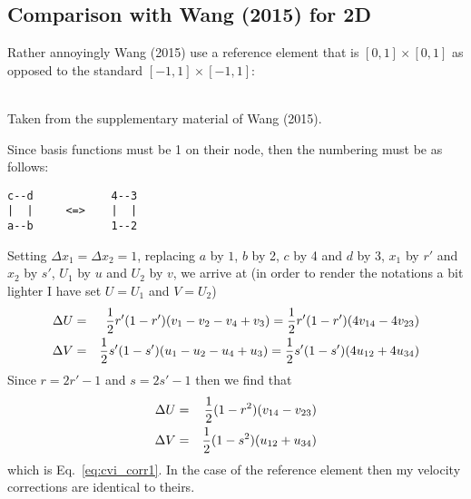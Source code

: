 \subsection{Comparison with Wang \etal (2015) for 2D}

Rather annoyingly Wang \etal (2015) use a reference element that is $[0,1]\times[0,1]$
as opposed to the standard $[-1,1]\times[-1,1]$:
\begin{center}
\\
{\captionfont Taken from the supplementary material of Wang \etal (2015).}
\end{center}
Since basis functions must be 1 on their node, then the numbering must be as follows:
\begin{verbatim}
c--d            4--3
|  |     <=>    |  |
a--b            1--2
\end{verbatim}
Setting $\Delta x_1=\Delta x_2=1$, replacing $a$ by $1$, $b$ by 2, 
$c$ by 4 and $d$ by 3, $x_1$ by $r'$ and $x_2$ by $s'$, $U_1$ by $u$
and $U_2$ by $v$, we arrive at 
(in order to render the notations a bit lighter I have set $U=U_1$ and $V=U_2$)
\begin{eqnarray}
\Delta U &=& \frac12 r'(1-r')(v_1-v_2-v_4+v_3) = \frac12 r'(1-r')(4v_{14}-4v_{23}) \nonumber\\
\Delta V &=& \frac12 s'(1-s')(u_1-u_2-u_4+u_3) = \frac12 s'(1-s')(4u_{12}+4u_{34}) \nonumber
\end{eqnarray}
Since $r=2r'-1$ and $s=2s'-1$ then we find that 
\begin{eqnarray}
\Delta U &=& \frac12 (1-r^2)(v_{14}-v_{23}) \nonumber\\
\Delta V &=& \frac12 (1-s^2)(u_{12}+u_{34})
\end{eqnarray}
which is Eq.~\eqref{eq:cvi_corr1}. In the case of the reference element then 
my velocity corrections are identical to theirs.


